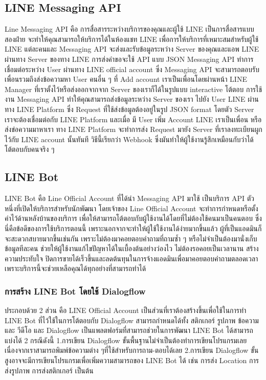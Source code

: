 \subsection{LINE Messaging API} 
\quad Line Messaging API คือ การสื่อสารระหว่างบริการของคุณและผู้ใช้ LINE เป็นการสื่อสารแบบสองฝ่าย จะทำให้คุณสามารถให้บริการได้ในห้องแชท LINE เพื่อการให้บริการที่เหมาะสมสำหรับผู้ใช้ LINE แต่ละคนและ Messaging API จะส่งและรับข้อมูลระหว่าง Server ของคุณและแอพ LINE ผ่านทาง Server ของทาง LINE การส่งคำขอจะใช้ API แบบ JSON Messaging API ทำการเชื่อมต่อระหว่าง User ผ่านทาง LINE official account ซึ่ง Messaging API จะสามารถตอบรับเพื่อนรวมถึงส่งข้อความหา User คนอื่น ๆ ที่ Add account เราเป็นเพื่อนโดยผ่านหน้า LINE Manager ที่เราตั้งไว้หรือส่งออกจากจาก Server ของเราก็ได้ในรูปแบบ interactive โต้ตอบ  การใช้งาน Messaging API ทำให้คุณสามารถส่งข้อมูลระหว่าง Server ของเรา ไปยัง User LINE ผ่านทาง LINE Platform ซึ่ง Request ที่ใช้ส่งข้อมูลต้องอยู่ในรูป JSON format โดยตัว Server เราจะต้องเชื่อมต่อกับ LINE Platform และเมื่อ มี User เพิ่ม Account LINE เราเป็นเพื่อน หรือ ส่งข่อความมาหาเรา ทาง LINE Platform จะทำการส่ง Request มายัง Server ที่เราลงทะเบียนผูกไว้กับ LINE account นั้นทันที วิธีนี้เรียกว่า Webhook ซึ่งมันทำให้ผู้ใช้งานรู้สึกเหมือนกับว่าได้โต้ตอบกับคนจริง ๆ 

\subsection{LINE Bot} 
\quad LINE Bot คือ Line Official Account ที่ได้นำ Messaging API มาใช้ เป็นบริการ API ตัวหนึ่งที่เปิดให้บริการสำหรับนักพัฒนา โดยเจ้าของ Line Official Account จะทำการกำหนดหรือตั้งค่าไว้ด้านหลังบ้านของบริการ เพื่อให้สามารถโต้ตอบกับผู้ใช้งานได้โดยที่ไม่ต้องใช้คนมาเป็นคนตอบ ซึ่งนี่คือข้อดีของการใช้บริการตอนนี้ เพราะนอกจากจะทำให้ผู้ใช้ใช้งานได้ง่ายมากขึ้นแล้ว ผู้ที่เป็นแอดมินก็จะสะดวกสบายมากขึ้นเช่นกัน เพราะไม่ต้องมาคอยตอบคำถามที่ถามซ้ำ ๆ หรือไม่จำเป็นต้องมานั่งเก็บข้อมูลทีละคน ช่วยให้ผู้ใช้งานแก้ไขปัญหาได้ในเบื้องต้นอย่างว่องไว ไม่ต้องรอคอยเป็นเวลานาน สร้างความประทับใจ ปิดการขายได้เร็วขึ้นและลดต้นทุนในการจ้างแอดมินเพื่อมาคอยตอบคำถามตลอดเวลา เพราะบริการนี้จะช่วยเหลือคุณได้ทุกอย่างที่สามารถทำได้ 
\subsubsection{การสร้าง LINE Bot โดยใช้ Dialogflow} 
\quad ประกอบด้วย 2 ส่วน คือ LINE Official Account เป็นส่วนที่เราต้องสร้างขึ้นเพื่อใช้ในการทำ LINE Bot ที่ไว้ใช้ในการโต้ตอบกับ Dialogflow สามารถกำหนดได้ทั้ง สติกเกอร์ รูปภาพ ข้อความ และ วีดีโอ และ Dialogflow เป็นแพลตฟอร์มที่สามารถช่วยในการพัฒนา LINE Bot ได้สามารถแบ่งได้ 2 กรณีดังนี้ 1.การเขียน Dialogflow ขั้นพื้นฐานไม่จำเป็นต้องทำการเขียนโปรแกรมเลย เนื่องจากเราสามารถพิมพ์ข้อความต่าง ๆที่ใช้สำหรับการถาม-ตอบได้เลย 2.การเขียน Dialogflow ขั้นสูงอาจจะมีการเขียนโปรแกรมเพื่อเพิ่มความสามารถของ LINE Bot ได้ เช่น การส่ง Location การส่งรูปภาพ การส่งสติกเกอร์ เป็นต้น 

